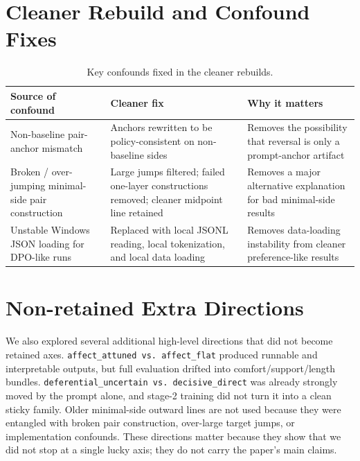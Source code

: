 \documentclass[11pt]{article}
\begin{document}
\section{Cleaner Rebuild and Confound Fixes}

\begin{table}[t]
\centering
\caption{Key confounds fixed in the cleaner rebuilds.}
\label{tab:cleaner-rebuild-fixes}
\begin{tabular}{p{3.5cm}p{4.5cm}p{7.0cm}}
\toprule
Source of confound & Cleaner fix & Why it matters \\
\midrule
Non-baseline pair-anchor mismatch & Anchors rewritten to be policy-consistent on non-baseline sides & Removes the possibility that reversal is only a prompt-anchor artifact \\
Broken / over-jumping minimal-side pair construction & Large jumps filtered; failed one-layer constructions removed; cleaner midpoint line retained & Removes a major alternative explanation for bad minimal-side results \\
Unstable Windows JSON loading for DPO-like runs & Replaced with local JSONL reading, local tokenization, and local data loading & Removes data-loading instability from cleaner preference-like results \\
\bottomrule
\end{tabular}
\end{table}

\section{Non-retained Extra Directions}

We also explored several additional high-level directions that did not become retained axes. \texttt{affect\_attuned vs.\ affect\_flat} produced runnable and interpretable outputs, but full evaluation drifted into comfort/support/length bundles. \texttt{deferential\_uncertain vs.\ decisive\_direct} was already strongly moved by the prompt alone, and stage-2 training did not turn it into a clean sticky family. Older minimal-side outward lines are not used because they were entangled with broken pair construction, over-large target jumps, or implementation confounds. These directions matter because they show that we did not stop at a single lucky axis; they do not carry the paper's main claims.


\end{document}
